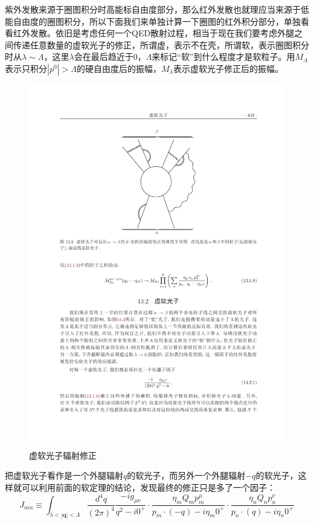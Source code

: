 紫外发散来源于圈图积分时高能标自由度部分，那么红外发散也就理应当来源于低能自由度的圈图积分，所以下面我们来单独计算一下圈图的红外积分部分，单独看看红外发散。依旧是考虑任何一个QED散射过程，相当于现在我们要考虑外腿之间传递任意数量的虚软光子的修正，所谓虚，表示不在壳，所谓软，表示圈图积分时从$\lambda\sim\Lambda$，这里$\lambda$会在最后趋近于0，$\Lambda$来标记“软”到什么程度才是软粒子。用$M_\Lambda$表示只积分$|p^0|>\Lambda$的硬自由度后的振幅，$M_\lambda$表示虚软光子修正后的振幅。
\begin{figure}[htbp]
	\centering
	\includegraphics{figs/fig8.pdf}
	\caption{虚软光子辐射修正}
\end{figure}
把虚软光子看作是一个外腿辐射$q$的软光子，而另外一个外腿辐射$-q$的软光子，这样就可以利用前面的软定理的结论，发现最终的修正只是多了一个因子：
\begin{equation}
	J_{mn}\equiv\int_{\lambda<|\mathbf{q}|<\Lambda} \frac{d^4q}{(2\pi)^4}\frac{-i g_{\mu\nu}}{q^2-i0^+}\cdot\frac{\eta_mQ_m p^\mu_m}{p_m\cdot(-q)-i\eta_m 0^+}\cdot\frac{\eta_nQ_n p^\nu_n}{p_n\cdot(q)-i\eta_n 0^+} 
\end{equation}
